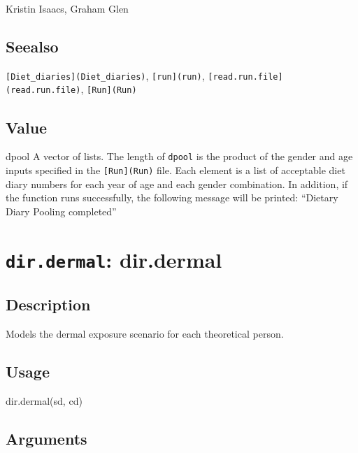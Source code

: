 \documentclass[
]{article}
\newenvironment{Shaded}{\begin{snugshade}}{\end{snugshade}}
\newcommand{\FunctionTok}[1]{\textcolor[rgb]{0.00,0.00,0.00}{#1}}
\newcommand{\NormalTok}[1]{#1}
\begin{document}
Kristin Isaacs, Graham Glen

\hypertarget{seealso-7}{%
\subsection{Seealso}\label{seealso-7}}

\texttt{{[}Diet\_diaries{]}(Diet\_diaries)}, \texttt{{[}run{]}(run)},
\texttt{{[}read.run.file{]}(read.run.file)}, \texttt{{[}Run{]}(Run)}

\hypertarget{value-8}{%
\subsection{Value}\label{value-8}}

dpool A vector of lists. The length of \texttt{dpool} is the product of
the gender and age inputs specified in the \texttt{{[}Run{]}(Run)} file.
Each element is a list of acceptable diet diary numbers for each year of
age and each gender combination. In addition, if the function runs
successfully, the following message will be printed: ``Dietary Diary
Pooling completed''

\hypertarget{dir.dermal-dir.dermal}{%
\section{\texorpdfstring{\texttt{dir.dermal}:
dir.dermal}{dir.dermal: dir.dermal}}\label{dir.dermal-dir.dermal}}

\hypertarget{description-13}{%
\subsection{Description}\label{description-13}}

Models the dermal exposure scenario for each theoretical person.

\hypertarget{usage-13}{%
\subsection{Usage}\label{usage-13}}

\begin{Shaded}
\begin{Highlighting}[]
\FunctionTok{dir.dermal}\NormalTok{(sd, cd)}
\end{Highlighting}
\end{Shaded}

\hypertarget{arguments-10}{%
\subsection{Arguments}\label{arguments-10}}
\end{document}
